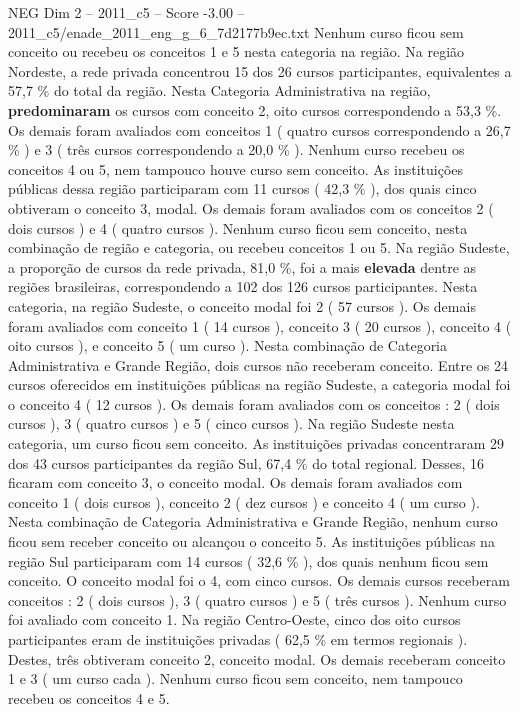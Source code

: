 \begin{textsample}{NEG Dim 2 – 2011\_c5 – Score -3.00 – 2011\_c5/enade\_2011\_eng\_g\_6\_7d2177b9ec.txt}
Nenhum curso ficou sem conceito ou recebeu os conceitos 1 e 5 nesta categoria na região.
Na região Nordeste, a rede privada concentrou 15 dos 26 cursos participantes, equivalentes a 57,7 \% do total da região.
Nesta Categoria Administrativa na região, \textbf{predominaram} os cursos com conceito 2, oito cursos correspondendo a 53,3 \%.
Os demais foram avaliados com conceitos 1 ( quatro cursos correspondendo a 26,7 \% ) e 3 ( três cursos correspondendo a 20,0 \% ).
Nenhum curso recebeu os conceitos 4 ou 5, nem tampouco houve curso sem conceito.
As instituições públicas dessa região participaram com 11 cursos ( 42,3 \% ), dos quais cinco obtiveram o conceito 3, modal.
Os demais foram avaliados com os conceitos 2 ( dois cursos ) e 4 ( quatro cursos ).
Nenhum curso ficou sem conceito, nesta combinação de região e categoria, ou recebeu conceitos 1 ou 5.
Na região Sudeste, a proporção de cursos da rede privada, 81,0 \%, foi a mais \textbf{elevada} dentre as regiões brasileiras, correspondendo a 102 dos 126 cursos participantes.
Nesta categoria, na região Sudeste, o conceito modal foi 2 ( 57 cursos ).
Os demais foram avaliados com conceito 1 ( 14 cursos ), conceito 3 ( 20 cursos ), conceito 4 ( oito cursos ), e conceito 5 ( um curso ).
Nesta combinação de Categoria Administrativa e Grande Região, dois cursos não receberam conceito.
Entre os 24 cursos oferecidos em instituições públicas na região Sudeste, a categoria modal foi o conceito 4 ( 12 cursos ).
Os demais foram avaliados com os conceitos : 2 ( dois cursos ), 3 ( quatro cursos ) e 5 ( cinco cursos ).
Na região Sudeste nesta categoria, um curso ficou sem conceito.
As instituições privadas concentraram 29 dos 43 cursos participantes da região Sul, 67,4 \% do total regional.
Desses, 16 ficaram com conceito 3, o conceito modal.
Os demais foram avaliados com conceito 1 ( dois cursos ), conceito 2 ( dez cursos ) e conceito 4 ( um curso ).
Nesta combinação de Categoria Administrativa e Grande Região, nenhum curso ficou sem receber conceito ou alcançou o conceito 5.
As instituições públicas na região Sul participaram com 14 cursos ( 32,6 \% ), dos quais nenhum ficou sem conceito.
O conceito modal foi o 4, com cinco cursos.
Os demais cursos receberam conceitos : 2 ( dois cursos ), 3 ( quatro cursos ) e 5 ( três cursos ).
Nenhum curso foi avaliado com conceito 1.
Na região Centro-Oeste, cinco dos oito cursos participantes eram de instituições privadas ( 62,5 \% em termos regionais ).
Destes, três obtiveram conceito 2, conceito modal.
Os demais receberam conceito 1 e 3 ( um curso cada ).
Nenhum curso ficou sem conceito, nem tampouco recebeu os conceitos 4 e 5.

\end{textsample}
